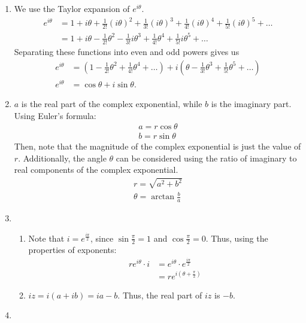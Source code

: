 \begin{sol}
\begin{enumerate}[label=\textbf{(\alph*)}] 
\item We use the Taylor expansion of $e^{i\theta}$.
\begin{align*}
    e^{i\theta} &= 1 + i\theta + \frac{1}{2!}(i\theta)^2 + \frac{1}{3!}(i\theta)^3 + \frac{1}{4!}(i\theta)^4 + \frac{1}{5!}(i\theta)^5 + \dots\\
    &= 1 + i\theta - \frac{1}{2!}\theta^2 - \frac{1}{3!}i\theta^3 + \frac{1}{4!}\theta^4 + \frac{1}{5!}i\theta^5 + \dots
\end{align*}
Separating these functions into even and odd powers gives us 
\begin{align*}
    e^{i\theta} &= \left(1 - \frac{1}{2!}\theta^2 + \frac{1}{4!}\theta^4 + \dots\right) + i\left(\theta -\frac{1}{3!}\theta^3 + \frac{1}{5!}\theta^5 + \dots\right)\\
    e^{i\theta} &= \cos\theta + i\sin\theta.
\end{align*}
\item $a$ is the real part of the complex exponential, while $b$ is the imaginary part. Using Euler's formula: 
\begin{align*}
    a = r\cos\theta \\
    b = r\sin\theta
\end{align*}
Then, note that the magnitude of the complex exponential is just the value of $r$. Additionally, the angle $\theta$ can be considered using the ratio of imaginary to real components of the complex exponential.
\begin{align*}
r = \sqrt{a^2 + b^2} \\
\theta = \arctan{\frac{b}{a}}
\end{align*}
\item
\begin{enumerate}[label=\textbf{(\roman*)}]
    \item Note that $i = e^{\frac{i\pi}{2}}$, since $\sin{\frac{\pi}{2}} = 1$ and $\cos{\frac{\pi}{2}} = 0$. Thus, using the properties of exponents:
\begin{align*}
    re^{i\theta} \cdot i &= e^{i\theta} \cdot e^{\frac{i\pi}{2}} \\
    &= re^{i(\theta + \frac{\pi}{2})}
\end{align*}
    \item $iz = i(a + ib) = ia - b$. Thus, the real part of $iz$ is $-b$.
\end{enumerate}
\item

\end{enumerate}
\end{sol}
